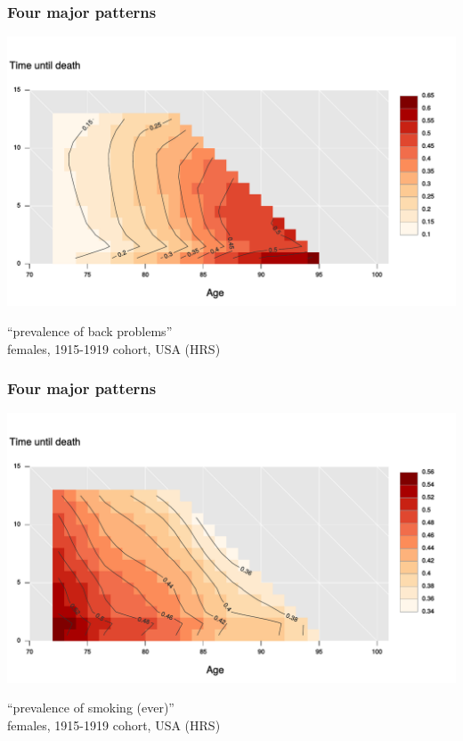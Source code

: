 \documentclass[20pt]{beamer}
\begin{document}
\begin{frame}
\frametitle{Four major patterns}
\begin{centering}
\includegraphics[scale=.95]{Figures/Figure2b.pdf}\\
\end{centering}
``prevalence of back problems''\\
females, 1915-1919 cohort, USA (HRS)
\end{frame}

\begin{frame}
\frametitle{Four major patterns}
\begin{centering}
\includegraphics[scale=.95]{Figures/Figure4a.pdf}\\
\end{centering}
``prevalence of smoking (ever)''\\
females, 1915-1919 cohort, USA (HRS)
\end{frame}
\end{document}
